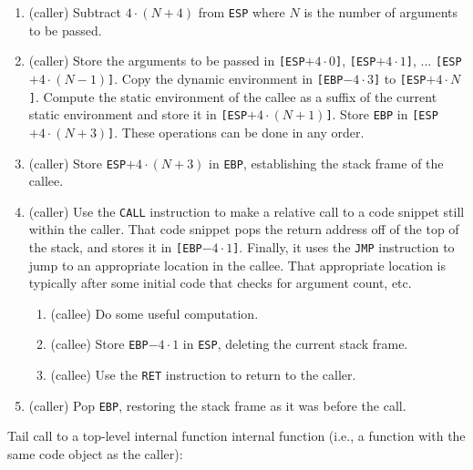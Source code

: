\begin{enumerate}
\item (caller) Subtract $4 \cdot (N + 4)$ from \texttt{ESP} where $N$
  is the number of arguments to be passed.
\item (caller) Store the arguments to be passed in
  \texttt{[ESP$+ 4 \cdot 0$]},
  \texttt{[ESP$+ 4 \cdot 1$]},
  $\ldots$
  \texttt{[ESP$+ 4 \cdot (N - 1)$]}.
  Copy the dynamic environment in
  \texttt{[EBP$-4 \cdot 3$]} to
  \texttt{[ESP$+4 \cdot N$]}.
  Compute the static environment of the callee as a suffix of the
  current static environment and 
  store it in
  \texttt{[ESP$+4 \cdot (N + 1)$]}.
  Store \texttt{EBP} in
  \texttt{[ESP$+4 \cdot (N + 3)$]}.
  These operations can be done in any order.
\item (caller) Store \texttt{ESP$+4 \cdot (N + 3)$} in \texttt{EBP},
  establishing the stack frame of the callee.
\item (caller) Use the \texttt{CALL} instruction to make a relative
  call to a code snippet still within the caller.  That code snippet pops
  the return address off of the top of the stack,
  and stores it in \texttt{[EBP$- 4 \cdot 1$]}.  Finally, it uses the
  \texttt{JMP} instruction to jump to an appropriate location in the
  callee.  That appropriate location is typically after some initial
  code that checks for argument count, etc.
  \begin{enumerate}
  \item (callee) Do some useful computation.
  \item (callee) Store \texttt{EBP$- 4 \cdot 1$} in \texttt{ESP},
    deleting the current stack frame.
  \item (callee) Use the \texttt{RET} instruction to return to the
    caller.
  \end{enumerate}
\item (caller) Pop \texttt{EBP}, restoring the stack frame as it was
  before the call.
\end{enumerate}

Tail call to a top-level internal function internal function (i.e., a
function with the same code object as the caller):

